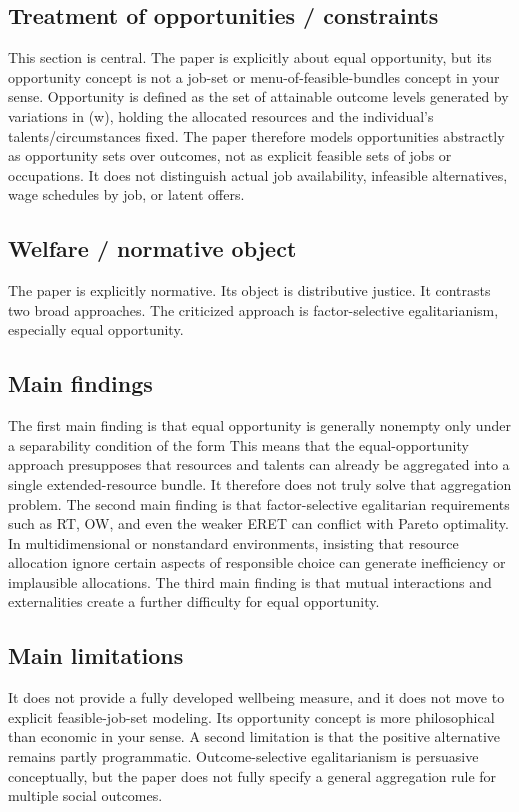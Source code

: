 \documentclass[11pt,a4paper]{article}
\begin{document}
\subsection*{Treatment of opportunities / constraints}
This section is central. The paper is explicitly about equal opportunity, but its opportunity concept is not a job-set or menu-of-feasible-bundles concept in your sense. Opportunity is defined as the set of attainable outcome levels generated by variations in (w), holding the allocated resources and the individual’s talents/circumstances fixed. The paper therefore models opportunities abstractly as opportunity sets over outcomes, not as explicit feasible sets of jobs or occupations. It does not distinguish actual job availability, infeasible alternatives, wage schedules by job, or latent offers.

\subsection*{Welfare / normative object}
The paper is explicitly normative. Its object is distributive justice. It contrasts two broad approaches. The criticized approach is factor-selective egalitarianism, especially equal opportunity.

\subsection*{Main findings}
The first main finding is that equal opportunity is generally nonempty only under a separability condition of the form This means that the equal-opportunity approach presupposes that resources and talents can already be aggregated into a single extended-resource bundle. It therefore does not truly solve that aggregation problem. The second main finding is that factor-selective egalitarian requirements such as RT, OW, and even the weaker ERET can conflict with Pareto optimality. In multidimensional or nonstandard environments, insisting that resource allocation ignore certain aspects of responsible choice can generate inefficiency or implausible allocations. The third main finding is that mutual interactions and externalities create a further difficulty for equal opportunity.

\subsection*{Main limitations}
It does not provide a fully developed wellbeing measure, and it does not move to explicit feasible-job-set modeling. Its opportunity concept is more philosophical than economic in your sense. A second limitation is that the positive alternative remains partly programmatic. Outcome-selective egalitarianism is persuasive conceptually, but the paper does not fully specify a general aggregation rule for multiple social outcomes.
\end{document}
